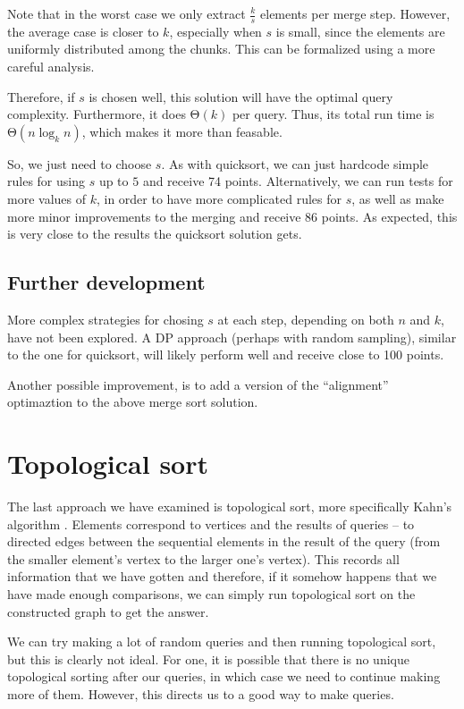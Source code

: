 \documentclass{article}
\begin{document}
Note that in the worst case we only extract $ \frac{k}{s} $ elements per merge step. However, the average case is closer to $ k $, especially when $ s $ is small, since the elements are uniformly distributed among the chunks. This can be formalized using a more careful analysis.

Therefore, if $ s $ is chosen well, this solution will have the optimal query complexity. Furthermore, it does $ \mathrm{\Theta}\left( k \right) $ per query. Thus, its total run time is $ \mathrm{\Theta}\left( n \log_k{n} \right) $, which makes it more than feasable.

So, we just need to choose $ s $. As with quicksort, we can just hardcode simple rules for using $ s $ up to $ 5 $ and receive 74 points. Alternatively, we can run tests for more values of $ k $, in order to have more complicated rules for $ s $, as well as make more minor improvements to the merging and receive 86 points. As expected, this is very close to the results the quicksort solution gets.

\subsection{Further development}

More complex strategies for chosing $ s $ at each step, depending on both $ n $ and $ k $, have not been explored. A DP approach (perhaps with random sampling), similar to the one for quicksort, will likely perform well and receive close to 100 points.

Another possible improvement, is to add a version of the ``alignment'' optimaztion to the above merge sort solution.

\section{Topological sort}

The last approach we have examined is topological sort, more specifically Kahn's algorithm \cite{topsort}. Elements correspond to vertices and the results of queries -- to directed edges between the sequential elements in the result of the query (from the smaller element's vertex to the larger one's vertex). This records all information that we have gotten and therefore, if it somehow happens that we have made enough comparisons, we can simply run topological sort on the constructed graph to get the answer.

We can try making a lot of random queries and then running topological sort, but this is clearly not ideal. For one, it is possible that there is no unique topological sorting after our queries, in which case we need to continue making more of them. However, this directs us to a good way to make queries.
\end{document}
